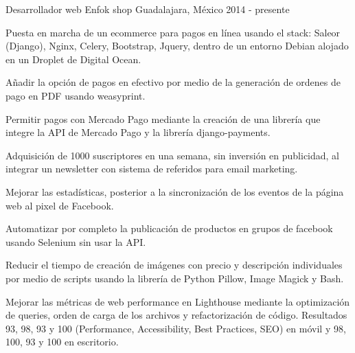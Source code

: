 

\begin{cventries}
  \cventry
    {Desarrollador web}
    {Enfok shop}
    {Guadalajara, México}
    {2014 - presente}
    {
      \begin{cvitems}
        \item {Puesta en marcha de un ecommerce para pagos en línea usando el stack: Saleor (Django), Nginx, Celery, Bootstrap, Jquery, dentro de un entorno Debian alojado en un Droplet de Digital Ocean. }
        \item {Añadir la opción de pagos en efectivo por medio de la generación de ordenes de pago en PDF usando weasyprint. }
        \item {Permitir pagos con Mercado Pago mediante la creación de una librería que integre la API de Mercado Pago y la librería django-payments. }
        \item {Adquisición de 1000 suscriptores en una semana, sin inversión en publicidad, al integrar un newsletter con sistema de referidos para email marketing. }
        \item {Mejorar las estadísticas, posterior a la sincronización de los eventos de la página web al pixel de Facebook.}
        \item {Automatizar por completo la publicación de productos en grupos de facebook usando Selenium sin usar la API. }
        \item {Reducir el tiempo de creación de imágenes con precio y descripción individuales por medio de scripts usando la librería de Python Pillow, Image Magick y Bash.}
        \item {Mejorar las métricas de web performance en Lighthouse mediante la optimización de queries, orden de carga de los archivos y refactorización de código. Resultados 93, 98, 93 y 100 (Performance, Accessibility, Best Practices, SEO) en móvil y 98, 100, 93 y 100 en escritorio.}
      \end{cvitems}
    }


\end{cventries}
